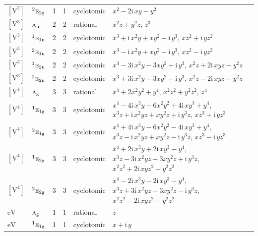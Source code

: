 \documentclass[10pt,a4paper]{article}
\numberwithin{equation}{section}
\newcommand{\irr}[1]{\text{\normalfont\scshape #1}}
\newcommand{\conjpair}[1]{{}^{#1}}
\newcommand{\ptag}[1]{\mathrm{#1}}
\newcommand{\iunit}{\mathrm{i}}
\newcommand{\jahn}[1]{\mathrm{#1}}
\newlength{\fillwidth}\newlength{\cellwidth}\newlength{\colwidth}
\begin{document}
{\begin{longtable}{@{}llrrl>{\RaggedRight\arraybackslash}p{\fillwidth}@{}}
$\jahn{[V^{2}]}$ & $\conjpair{2}\irr{e}_{2\ptag{g}}$ & 1 & 1 & cyclotomic & $x^{2} - 2\iunit{}\,xy - y^{2}$\\
$\jahn{[V^{3}]}$ & $\irr{a}_{\ptag{u}}$ & 2 & 2 & rational & $x^{2}z + y^{2}z$, $z^{3}$\\
$\jahn{[V^{3}]}$ & $\conjpair{1}\irr{e}_{1\ptag{u}}$ & 2 & 2 & cyclotomic & $x^{3} + \iunit{}\,x^{2}y + xy^{2} + \iunit{}\,y^{3}$, $xz^{2} + \iunit{}\,yz^{2}$\\
$\jahn{[V^{3}]}$ & $\conjpair{2}\irr{e}_{1\ptag{u}}$ & 2 & 2 & cyclotomic & $x^{3} - \iunit{}\,x^{2}y + xy^{2} - \iunit{}\,y^{3}$, $xz^{2} - \iunit{}\,yz^{2}$\\
$\jahn{[V^{3}]}$ & $\conjpair{1}\irr{e}_{2\ptag{u}}$ & 2 & 2 & cyclotomic & $x^{3} - 3\iunit{}\,x^{2}y - 3xy^{2} + \iunit{}\,y^{3}$, $x^{2}z + 2\iunit{}\,xyz - y^{2}z$\\
$\jahn{[V^{3}]}$ & $\conjpair{2}\irr{e}_{2\ptag{u}}$ & 2 & 2 & cyclotomic & $x^{3} + 3\iunit{}\,x^{2}y - 3xy^{2} - \iunit{}\,y^{3}$, $x^{2}z - 2\iunit{}\,xyz - y^{2}z$\\
$\jahn{[V^{4}]}$ & $\irr{a}_{\ptag{g}}$ & 3 & 3 & rational & $x^{4} + 2x^{2}y^{2} + y^{4}$, $x^{2}z^{2} + y^{2}z^{2}$, $z^{4}$\\
$\jahn{[V^{4}]}$ & $\conjpair{1}\irr{e}_{1\ptag{g}}$ & 3 & 3 & cyclotomic & $x^{4} - 4\iunit{}\,x^{3}y - 6x^{2}y^{2} + 4\iunit{}\,xy^{3} + y^{4}$, $x^{3}z + \iunit{}\,x^{2}yz + xy^{2}z + \iunit{}\,y^{3}z$, $xz^{3} + \iunit{}\,yz^{3}$\\
$\jahn{[V^{4}]}$ & $\conjpair{2}\irr{e}_{1\ptag{g}}$ & 3 & 3 & cyclotomic & $x^{4} + 4\iunit{}\,x^{3}y - 6x^{2}y^{2} - 4\iunit{}\,xy^{3} + y^{4}$, $x^{3}z - \iunit{}\,x^{2}yz + xy^{2}z - \iunit{}\,y^{3}z$, $xz^{3} - \iunit{}\,yz^{3}$\\
$\jahn{[V^{4}]}$ & $\conjpair{1}\irr{e}_{2\ptag{g}}$ & 3 & 3 & cyclotomic & $x^{4} + 2\iunit{}\,x^{3}y + 2\iunit{}\,xy^{3} - y^{4}$, $x^{3}z - 3\iunit{}\,x^{2}yz - 3xy^{2}z + \iunit{}\,y^{3}z$, $x^{2}z^{2} + 2\iunit{}\,xyz^{2} - y^{2}z^{2}$\\
$\jahn{[V^{4}]}$ & $\conjpair{2}\irr{e}_{2\ptag{g}}$ & 3 & 3 & cyclotomic & $x^{4} - 2\iunit{}\,x^{3}y - 2\iunit{}\,xy^{3} - y^{4}$, $x^{3}z + 3\iunit{}\,x^{2}yz - 3xy^{2}z - \iunit{}\,y^{3}z$, $x^{2}z^{2} - 2\iunit{}\,xyz^{2} - y^{2}z^{2}$\\
$\jahn{eV}$ & $\irr{a}_{\ptag{g}}$ & 1 & 1 & rational & $z$\\
$\jahn{eV}$ & $\conjpair{1}\irr{e}_{1\ptag{g}}$ & 1 & 1 & cyclotomic & $x + \iunit{}\,y$\\

\end{longtable}}
\end{document}

